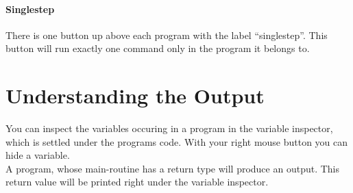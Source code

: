 \documentclass[parskip=full]{memoir}
\begin{document}
\paragraph{Singlestep}
There is one button up above each program with the label \enquote{singlestep}. This button will run exactly one command only in the program it belongs to.
\section{Understanding the Output}
You can inspect the variables occuring in a program in the variable inspector, which is settled under the programs code. With your right mouse button you can hide a variable.\\
A program, whose main-routine has a return type will produce an output. 
This return value will be printed right under the variable inspector.
\end{document}
